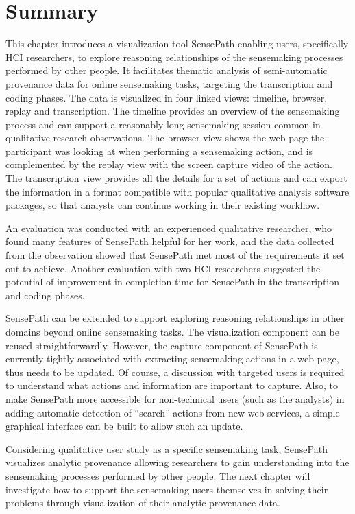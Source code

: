 \section{Summary}
This chapter introduces a visualization tool SensePath enabling users, specifically HCI researchers, to explore reasoning relationships of the sensemaking processes performed by other people. It facilitates thematic analysis of semi-automatic provenance data for online sensemaking tasks, targeting the transcription and coding phases. The data is visualized in four linked views: timeline, browser, replay and transcription. The timeline provides an overview of the sensemaking process and can support a reasonably long sensemaking session common in qualitative research observations. The browser view shows the web page the participant was looking at when performing a sensemaking action, and is complemented by the replay view with the screen capture video of the action. The transcription view provides all the details for a set of actions and can export the information in a format compatible with popular qualitative analysis software packages, so that analysts can continue working in their existing workflow.

An evaluation was conducted with an experienced qualitative researcher, who found many features of SensePath helpful for her work, and the data collected from the observation showed that SensePath met most of the requirements it set out to achieve. Another evaluation with two HCI researchers suggested the potential of improvement in completion time for SensePath in the transcription and coding phases.

SensePath can be extended to support exploring reasoning relationships in other domains beyond online sensemaking tasks. The visualization component can be reused straightforwardly. However, the capture component of SensePath is currently tightly associated with extracting sensemaking actions in a web page, thus needs to be updated. Of course, a discussion with targeted users is required to understand what actions and information are important to capture.  Also, to make SensePath more accessible for non-technical users (such as the analysts) in adding automatic detection of ``search'' actions from new web services, a simple graphical interface can be built to allow such an update.

Considering qualitative user study as a specific sensemaking task, SensePath visualizes analytic provenance allowing researchers to gain understanding into the sensemaking processes performed by other people. The next chapter will investigate how to support the sensemaking users themselves in solving their problems through visualization of their analytic provenance data.